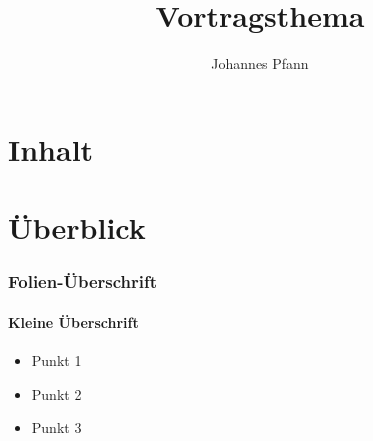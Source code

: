 \documentclass[compress]{beamer}
\author[Pfann]{%
  Johannes Pfann
}
\date{}
\institute[FAU Erlangen-Nürnberg]{
  Lehrstuhl für Software Engineering\\
  Friedrich-Alexander-Universität Erlangen-Nürnberg
}
\title{Vortragsthema}
\begin{document}
\frame{\titlepage} 

\section[Inhalt]{Inhalt}

\frame{\tableofcontents}




\section[Überblick]{Überblick}





\begin{frame}
  \frametitle{Folien-Überschrift}
  \framesubtitle{Kleine Überschrift}
  \begin{itemize}
  \item  Punkt 1
  \item Punkt 2
  \item  Punkt 3
  \end{itemize}
\end{frame}
\end{document}
